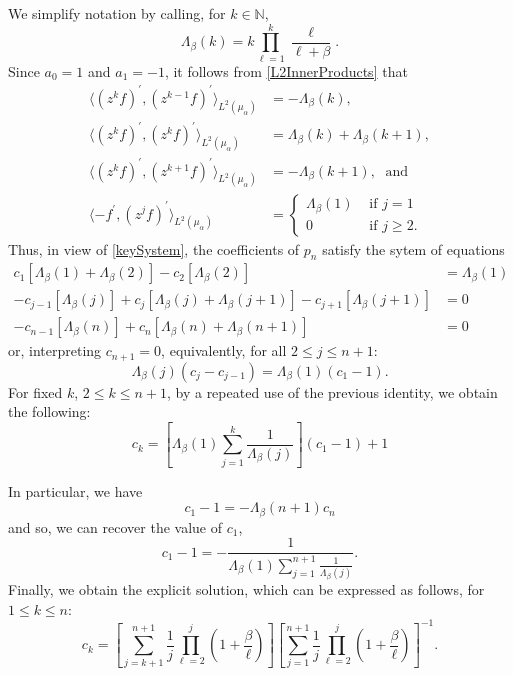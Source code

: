 \documentclass[11 pt,reqno]{amsart}
\theoremstyle{definition}
\theoremstyle{remark}
\numberwithin{equation}{section} \numberwithin{figure}{section}
\newcommand{\NN}{{\mathbb N}}
\begin{document}
We simplify notation by calling, for $k \in \NN$,
$$\Lambda_\beta(k)= k\prod_{\ell=1}^k\frac{\ell}{\ell+\beta}.$$
  Since
$a_0=1$ and $a_1=-1$, it follows from \eqref{L2InnerProducts} that
\begin{align*}
      \langle (z^{k} f)^{\prime},(z^{k-1}f)^{\prime}\rangle_{L^{2}(\mu_{\alpha})}
      &=-\Lambda_\beta(k),\\
            \langle (z^{k} f)^{\prime},(z^{k}f)^{\prime}\rangle_{L^{2}(\mu_{\alpha})}
      &=\Lambda_\beta(k)+\Lambda_\beta(k+1),\\
      \langle (z^{k} f)^{\prime},(z^{k+1}f)^{\prime}\rangle_{L^{2}(\mu_{\alpha})}
      &=-\Lambda_\beta(k+1),\;\text{ and }\\
      \langle -f^{\prime},(z^{j}f)^{\prime}\rangle_{L^{2}(\mu_{\alpha})}
      &=\left\{
      \begin{array}{ll}
            \Lambda_\beta(1)   &   \text{ if }j=1\\
            0                                   &   \text{ if }j\geq 2.
      \end{array}\right.
\end{align*}
 Thus, in view of \eqref{keySystem}, the
coefficients of $p_{n}$ satisfy the sytem of equations
\begin{align*}
      c_{1}\left[\Lambda_\beta(1)+\Lambda_\beta(2)\right]
      -c_{2}\left[\Lambda_\beta(2)\right]&=\Lambda_\beta(1)\\
      -c_{j-1}\left[\Lambda_\beta(j)\right]+
      c_{j}\left[\Lambda_\beta(j)+\Lambda_\beta(j+1)\right]
      -c_{j+1}\left[\Lambda_\beta(j+1)\right]&=0\\
      -c_{n-1}\left[\Lambda_\beta(n)\right]
      +c_{n}\left[\Lambda_\beta(n)+\Lambda_\beta(n+1)\right]&=0
\end{align*}
or, interpreting $c_{n+1}=0$, equivalently, for all $2\leq j \leq
n+1$:
$$\Lambda_\beta(j)(c_j - c_{j-1}) = \Lambda_\beta(1) (c_1-1).$$
For fixed $k$, $2\leq k\leq n+1$, by a repeated use of the previous
identity, we obtain the following:
\begin{equation}\label{generalCkFormula}
c_{k}=\left[\Lambda_\beta(1) \sum_{j=1}^k
\frac{1}{\Lambda_\beta(j)}\right](c_1-1)+1
\end{equation}

In particular, we have
\[  c_1-1=-\Lambda_\beta(n+1)c_{n} \]
and so, we can recover the value of $c_1$,
$$c_1-1=-\frac{1}{\Lambda_\beta(1)\sum_{j=1}^{n+1}\frac{1}{\Lambda_\beta(j)}}.$$
Finally, we obtain the explicit solution, which can be expressed as
follows, for $1\leq k\leq n$:
\begin{equation}
      c_{k}=\left[\sum_{j=k+1}^{n+1}\frac{1}{j}
            \prod_{\ell=2}^j \left(1+\frac{\beta}{\ell}\right)\right]
            \left[\sum_{j=1}^{n+1}\frac{1}{j}
            \prod_{\ell=2}^j\left(1+\frac{\beta}{\ell}\right)\right]^{-1}.
      \label{CkFormulaWithBetas}
\end{equation}
\end{document}
